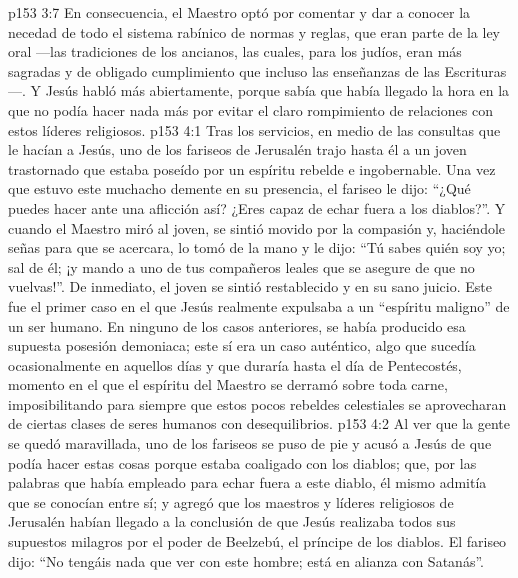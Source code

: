 \vs p153 3:7 En consecuencia, el Maestro optó por comentar y dar a conocer la necedad de todo el sistema rabínico de normas y reglas, que eran parte de la ley oral ---las tradiciones de los ancianos, las cuales, para los judíos, eran más sagradas y de obligado cumplimiento que incluso las enseñanzas de las Escrituras---. Y Jesús habló más abiertamente, porque sabía que había llegado la hora en la que no podía hacer nada más por evitar el claro rompimiento de relaciones con estos líderes religiosos.
\vs p153 4:1 Tras los servicios, en medio de las consultas que le hacían a Jesús, uno de los fariseos de Jerusalén trajo hasta él a un joven trastornado que estaba poseído por un espíritu rebelde e ingobernable. Una vez que estuvo este muchacho demente en su presencia, el fariseo le dijo: “¿Qué puedes hacer ante una aflicción así? ¿Eres capaz de echar fuera a los diablos?”. Y cuando el Maestro miró al joven, se sintió movido por la compasión y, haciéndole señas para que se acercara, lo tomó de la mano y le dijo: “Tú sabes quién soy yo; sal de él; ¡y mando a uno de tus compañeros leales que se asegure de que no vuelvas!”. De inmediato, el joven se sintió restablecido y en su sano juicio. Este fue el primer caso en el que Jesús realmente expulsaba a un “espíritu maligno” de un ser humano. En ninguno de los casos anteriores, se había producido esa supuesta posesión demoniaca; este sí era un caso auténtico, algo que sucedía ocasionalmente en aquellos días y que duraría hasta el día de Pentecostés, momento en el que el espíritu del Maestro se derramó sobre toda carne, imposibilitando para siempre que estos pocos rebeldes celestiales se aprovecharan de ciertas clases de seres humanos con desequilibrios.
\vs p153 4:2 Al ver que la gente se quedó maravillada, uno de los fariseos se puso de pie y acusó a Jesús de que podía hacer estas cosas porque estaba coaligado con los diablos; que, por las palabras que había empleado para echar fuera a este diablo, él mismo admitía que se conocían entre sí; y agregó que los maestros y líderes religiosos de Jerusalén habían llegado a la conclusión de que Jesús realizaba todos sus supuestos milagros por el poder de Beelzebú, el príncipe de los diablos. El fariseo dijo: “No tengáis nada que ver con este hombre; está en alianza con Satanás”.
